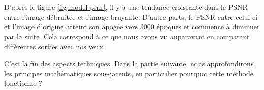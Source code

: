 \documentclass[
  11pt,
  dvipsnames]{article}
\begin{document}
D'après le figure \ref{fig:model-psnr}, il y a une tendance croissante dans le PSNR entre l'image débruitée et l'image bruyante. D'autre parts, le PSNR entre celui-ci et l'image d'origine atteint son apogée vers 3000 époques et commence à diminuer par la suite. Cela correspond à ce que nous avons vu auparavant en comparant différentes sorties avec nos yeux.

C'est la fin des aspects techniques. Dans la partie suivante, nous approfondirons les principes mathématiques sous-jacents, en particulier pourquoi cette méthode fonctionne ?

\newpage

\printbibliography
\end{document}
